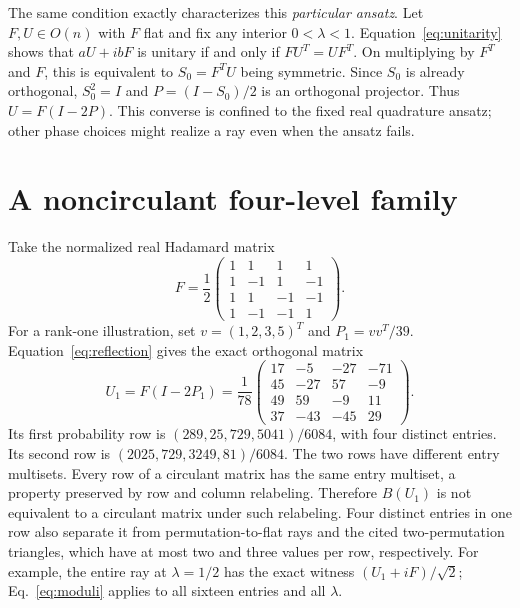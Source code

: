 \documentclass[aip,jmp,preprint]{revtex4-2}
\begin{document}
The same condition exactly characterizes this \emph{particular ansatz}. Let $F,U\in O(n)$ with $F$ flat and fix any interior $0<\lambda<1$. Equation~\eqref{eq:unitarity} shows that $aU+ibF$ is unitary if and only if $FU^T=UF^T$. On multiplying by $F^T$ and $F$, this is equivalent to $S_0=F^TU$ being symmetric. Since $S_0$ is already orthogonal, $S_0^2=I$ and $P=(I-S_0)/2$ is an orthogonal projector. Thus $U=F(I-2P)$. This converse is confined to the fixed real quadrature ansatz; other phase choices might realize a ray even when the ansatz fails.

\section{A noncirculant four-level family}

Take the normalized real Hadamard matrix
\begin{equation}
 F=\frac12\begin{pmatrix}
 1&1&1&1\\ 1&-1&1&-1\\ 1&1&-1&-1\\ 1&-1&-1&1
 \end{pmatrix}.
 \label{eq:F4}
\end{equation}
For a rank-one illustration, set $v=(1,2,3,5)^T$ and $P_1=vv^T/39$. Equation~\eqref{eq:reflection} gives the exact orthogonal matrix
\begin{equation}
 U_1=F(I-2P_1)=\frac1{78}\begin{pmatrix}
 17&-5&-27&-71\\
 45&-27&57&-9\\
 49&59&-9&11\\
 37&-43&-45&29
 \end{pmatrix}.
 \label{eq:U1}
\end{equation}
Its first probability row is $(289,25,729,5041)/6084$, with four distinct entries. Its second row is $(2025,729,3249,81)/6084$. The two rows have different entry multisets. Every row of a circulant matrix has the same entry multiset, a property preserved by row and column relabeling. Therefore $B(U_1)$ is not equivalent to a circulant matrix under such relabeling. Four distinct entries in one row also separate it from permutation-to-flat rays and the cited two-permutation triangles, which have at most two and three values per row, respectively. For example, the entire ray at $\lambda=1/2$ has the exact witness $(U_1+iF)/\sqrt2$; Eq.~\eqref{eq:moduli} applies to all sixteen entries and all $\lambda$.
\end{document}
